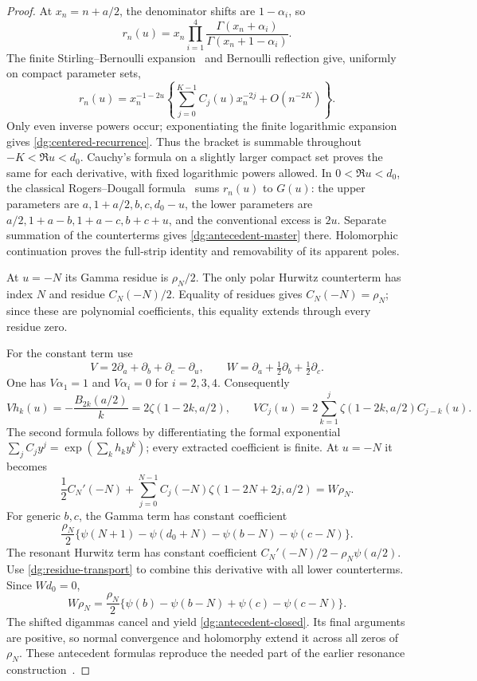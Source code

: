 \documentclass[11pt,a4paper]{article}
\numberwithin{equation}{section}
\theoremstyle{definition}
\theoremstyle{remark}
\begin{document}
\begin{proof}
At $x_n=n+a/2$, the denominator shifts are $1-\alpha_i$, so
\[
 r_n(u)=x_n\prod_{i=1}^4
                   \frac{\Gamma(x_n+\alpha_i)}{\Gamma(x_n+1-\alpha_i)}.
\]
The finite Stirling--Bernoulli expansion~\cite{DLMFGammaAsymptotic} and Bernoulli reflection
give, uniformly on compact parameter sets,
\[
 r_n(u)=x_n^{-1-2u}\left\{\sum_{j=0}^{K-1}C_j(u)x_n^{-2j}
                                     +O(n^{-2K})\right\}.
\]
Only even inverse powers occur; exponentiating the finite logarithmic
expansion gives \eqref{dg:centered-recurrence}. Thus the bracket is
summable throughout $-K<\Re u<d_0$. Cauchy's formula on a slightly
larger compact set proves the same for each derivative, with fixed
logarithmic powers allowed. In $0<\Re u<d_0$, the classical
Rogers--Dougall formula~\cite{DLMFDougall} sums $r_n(u)$ to $G(u)$:
the upper parameters are $a,1+a/2,b,c,d_0-u$, the lower parameters
are $a/2,1+a-b,1+a-c,b+c+u$, and the conventional excess is $2u$.
Separate summation of the counterterms gives
\eqref{dg:antecedent-master} there. Holomorphic continuation proves
the full-strip identity and removability of its apparent poles.

At $u=-N$ its Gamma residue is $\rho_N/2$. The only polar Hurwitz
counterterm has index $N$ and residue $C_N(-N)/2$. Equality of
residues gives $C_N(-N)=\rho_N$; since these are polynomial
coefficients, this equality extends through every residue zero.

For the constant term use
\[
 V=2\partial_a+\partial_b+\partial_c-\partial_u,
 \qquad W=\partial_a+\tfrac12\partial_b+\tfrac12\partial_c.
\]
One has $V\alpha_1=1$ and $V\alpha_i=0$ for $i=2,3,4$.
Consequently
\[
 Vh_k(u)=-\frac{B_{2k}(a/2)}k=2\zeta(1-2k,a/2),
 \qquad VC_j(u)=2\sum_{k=1}^j\zeta(1-2k,a/2)C_{j-k}(u).
\]
The second formula follows by differentiating the formal exponential
$\sum_jC_jy^j=\exp(\sum_kh_ky^k)$; every extracted coefficient is
finite. At $u=-N$ it becomes
\begin{equation}
 \frac12C_N'(-N)+\sum_{j=0}^{N-1}
 C_j(-N)\zeta(1-2N+2j,a/2)=W\rho_N.
 \label{dg:residue-transport}
\end{equation}
For generic $b,c$, the Gamma term has constant coefficient
\[
 \frac{\rho_N}{2}
 \{\psi(N+1)-\psi(d_0+N)-\psi(b-N)-\psi(c-N)\}.
\]
The resonant Hurwitz term has constant coefficient
$C_N'(-N)/2-\rho_N\psi(a/2)$. Use
\eqref{dg:residue-transport} to combine this derivative with all
lower counterterms. Since $Wd_0=0$,
\[
 W\rho_N=\frac{\rho_N}{2}
 \{\psi(b)-\psi(b-N)+\psi(c)-\psi(c-N)\}.
\]
The shifted digammas cancel and yield
\eqref{dg:antecedent-closed}. Its final arguments are positive, so
normal convergence and holomorphy extend it across all zeros of
$\rho_N$. These antecedent formulas reproduce the needed part of
the earlier resonance construction~\cite{RepoDougall,RepoTransport}.
\end{proof}
\end{document}
